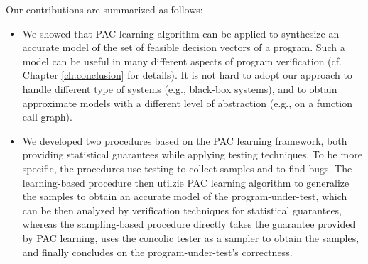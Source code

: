 Our contributions are summarized as follows:
\begin{itemize}
	\item We showed that PAC learning algorithm can be applied to synthesize an accurate model of the set of feasible decision vectors of a program. Such a model can be useful in many different aspects of program verification (cf. Chapter \ref{ch:conclusion} for details). It is not hard to adopt our approach to handle different type of systems (e.g., black-box systems), and to obtain approximate models with a different level of abstraction (e.g., on a function call graph).
	\item We developed two procedures based on the PAC learning framework, both providing statistical guarantees while applying testing techniques. To be more specific, the procedures use testing to collect samples and to find bugs. The learning-based procedure then utilzie PAC learning algorithm to generalize the samples to obtain an accurate model of the program-under-test, which can be then analyzed by verification techniques for statistical guarantees, whereas the sampling-based procedure directly takes the guarantee provided by PAC learning, uses the concolic tester as a sampler to obtain the samples, and finally concludes on the program-under-test's correctness. 
\end{itemize}

